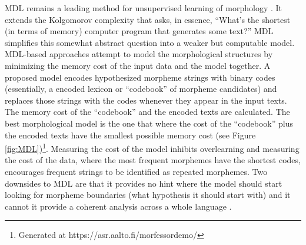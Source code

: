 \documentclass[12pt]{article}
\begin{document}
MDL remains a leading method for unsupervised learning of morphology \cite{hammarstrom_unsupervised_2011}. It extends the Kolgomorov complexity that asks, in essence, ``What's the shortest (in terms of memory) computer program that generates some text?'' MDL simplifies this somewhat abstract question into a weaker but computable model. MDL-based approaches attempt to model the morphological structures by minimizing the memory cost of the input data and the model together. A proposed model encodes hypothesized morpheme strings with binary codes (essentially, a encoded lexicon or ``codebook'' of morpheme candidates) and replaces those strings with the codes whenever they appear in the input texts. The memory cost of the ``codebook'' and the encoded texts are calculated. The best morphological model is the one that where the cost of the ``codebook'' plus the encoded texts have the smallest possible memory cost (see Figure \ref{fig:MDL})\footnote{Generated at https://asr.aalto.fi/morfessordemo/}. Measuring the cost of the model inhibits overlearning and measuring the cost of the data, where the most frequent morphemes have the shortest codes, encourages frequent strings to be identified as repeated morphemes. Two downsides to MDL are that it provides no hint where the model should start looking for morpheme boundaries (what hypothesis it should start with) and it cannot it provide a coherent analysis across a whole language \cite{goldsmith_computational_2017}.
\end{document}
